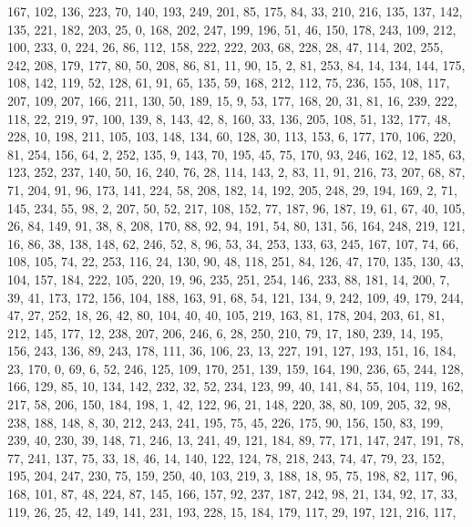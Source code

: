 \begin{DoxyCode}
       167, 102, 136, 223, 70, 140, 193, 249, 201, 85, 175, 84, 33, 210, 216, 135, 137, 142, 135, 221, 182, 203, 25,
       0, 168, 202, 247, 199, 196, 51, 46, 150, 178, 243, 109, 212, 100, 233, 0, 224, 26, 86, 112, 158, 222, 222,
       203, 68, 228, 28, 47, 114, 202, 255, 242, 208, 179, 177, 80, 50, 208, 86, 81, 11, 90, 15, 2, 81, 253, 84, 14,
       134, 144, 175, 108, 142, 119, 52, 128, 61, 91, 65, 135, 59, 168, 212, 112, 75, 236, 155, 108, 117, 207,
       109, 207, 166, 211, 130, 50, 189, 15, 9, 53, 177, 168, 20, 31, 81, 16, 239, 222, 118, 22, 219, 97, 100, 139, 8,
       143, 42, 8, 160, 33, 136, 205, 108, 51, 132, 177, 48, 228, 10, 198, 211, 105, 103, 148, 134, 60, 128, 30,
       113, 153, 6, 177, 170, 106, 220, 81, 254, 156, 64, 2, 252, 135, 9, 143, 70, 195, 45, 75, 170, 93, 246, 162,
       12, 185, 63, 123, 252, 237, 140, 50, 16, 240, 76, 28, 114, 143, 2, 83, 11, 91, 216, 73, 207, 68, 87, 71, 204,
       91, 96, 173, 141, 224, 58, 208, 182, 14, 192, 205, 248, 29, 194, 169, 2, 71, 145, 234, 55, 98, 2, 207, 50,
       52, 217, 108, 152, 77, 187, 96, 187, 19, 61, 67, 40, 105, 26, 84, 149, 91, 38, 8, 208, 170, 88, 92, 94, 191,
       54, 80, 131, 56, 164, 248, 219, 121, 16, 86, 38, 138, 148, 62, 246, 52, 8, 96, 53, 34, 253, 133, 63, 245,
       167, 107, 74, 66, 108, 105, 74, 22, 253, 116, 24, 130, 90, 48, 118, 251, 84, 126, 47, 170, 135, 130, 43, 104,
       157, 184, 222, 105, 220, 19, 96, 235, 251, 254, 146, 233, 88, 181, 14, 200, 7, 39, 41, 173, 172, 156, 104,
       188, 163, 91, 68, 54, 121, 134, 9, 242, 109, 49, 179, 244, 47, 27, 252, 18, 26, 42, 80, 104, 40, 40, 105,
       219, 163, 81, 178, 204, 203, 61, 81, 212, 145, 177, 12, 238, 207, 206, 246, 6, 28, 250, 210, 79, 17, 180, 239,
       14, 195, 156, 243, 136, 89, 243, 178, 111, 36, 106, 23, 13, 227, 191, 127, 193, 151, 16, 184, 23, 170, 0,
       69, 6, 52, 246, 125, 109, 170, 251, 139, 159, 164, 190, 236, 65, 244, 128, 166, 129, 85, 10, 134, 142, 232,
       32, 52, 234, 123, 99, 40, 141, 84, 55, 104, 119, 162, 217, 58, 206, 150, 184, 198, 1, 42, 122, 96, 21, 148,
       220, 38, 80, 109, 205, 32, 98, 238, 188, 148, 8, 30, 212, 243, 241, 195, 75, 45, 226, 175, 90, 156, 150, 83,
       199, 239, 40, 230, 39, 148, 71, 246, 13, 241, 49, 121, 184, 89, 77, 171, 147, 247, 191, 78, 77, 241, 137,
       75, 33, 18, 46, 14, 140, 122, 124, 78, 218, 243, 74, 47, 79, 23, 152, 195, 204, 247, 230, 75, 159, 250, 40,
       103, 219, 3, 188, 18, 95, 75, 198, 82, 117, 96, 168, 101, 87, 48, 224, 87, 145, 166, 157, 92, 237, 187, 242,
       98, 21, 134, 92, 17, 33, 119, 26, 25, 42, 149, 141, 231, 193, 228, 15, 184, 179, 117, 29, 197, 121, 216, 117,

\end{DoxyCode}
